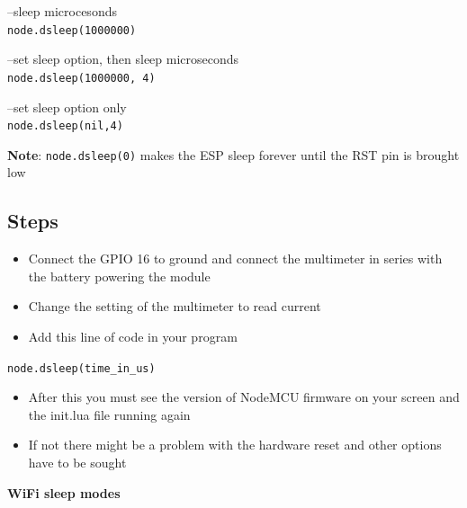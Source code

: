 \documentclass[16pt]{article}
\begin{document}
\vspace{0.1cm}

--sleep microcesonds\\
\texttt{node.dsleep(1000000)}\\

\vspace{0.1cm}

--set sleep option, then sleep microseconds\\
\texttt{node.dsleep(1000000, 4)}\\

\vspace{0.1cm}

--set sleep option only\\
\texttt{node.dsleep(nil,4)}

\vspace{0.3cm}

\textbf{Note}: \texttt{node.dsleep(0)} makes the ESP sleep forever until
the RST pin is brought low


\vspace{0.5cm}
\subsection{Steps}

\begin{itemize}

\item
  Connect the GPIO 16 to ground and connect the multimeter in series
  with the battery powering the module
\item
  Change the setting of the multimeter to read current
\item
  Add this line of code in your program
\end{itemize}

\texttt{node.dsleep(time\_in\_us)}

\begin{itemize}

\item
  After this you must see the version of NodeMCU firmware on your screen
  and the init.lua file running again
\item
  If not there might be a problem with the hardware reset and other
  options have to be sought
\end{itemize}

\textbf{WiFi sleep modes}
\end{document}
